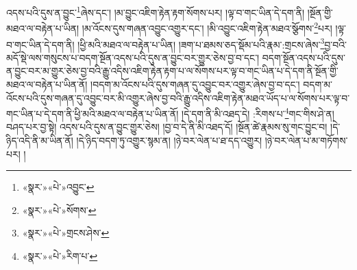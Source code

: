 འདས་པའི་དུས་ན་བྱུང་\footnote{«སྣར་»«པེ་»འབྱུང་}ཞེས་དང་། །མ་བྱུང་འཇིག་རྟེན་རྟག་སོགས་པར། །ལྟ་བ་གང་ཡིན་དེ་དག་ནི། །སྔོན་གྱི་མཐའ་ལ་བརྟེན་པ་ཡིན། །མ་འོངས་དུས་གཞན་འབྱུང་འགྱུར་དང་། །མི་འབྱུང་འཇིག་རྟེན་མཐའ་སྩོགས་\footnote{«སྣར་»«པེ་»སོགས་}པར། །ལྟ་བ་གང་ཡིན་དེ་དག་ནི། །ཕྱི་མའི་མཐའ་ལ་བརྟེན་པ་ཡིན། །ཟག་པ་ཐམས་ཅད་སྡོམ་པའི་རྣམ་:གྲངས་ཞེས་\footnote{«སྣར་»«པེ་»གྲངས་ཤེས་}བྱ་བའི་མདོ་སྡེ་ལས་གསུངས་པ་བདག་སྔོན་འདས་པའི་དུས་ན་བྱུང་བར་གྱུར་ཅེས་བྱ་བ་དང་། བདག་སྔོན་འདས་པའི་དུས་ན་བྱུང་བར་མ་གྱུར་ཅེས་བྱ་བའི་རྒྱུ་འདིས་འཇིག་རྟེན་རྟག་པ་ལ་སོགས་པར་ལྟ་བ་གང་ཡིན་པ་དེ་དག་ནི་སྔོན་གྱི་མཐའ་ལ་བརྟེན་པ་ཡིན་ནོ། །བདག་མ་འོངས་པའི་དུས་གཞན་དུ་འབྱུང་བར་འགྱུར་ཞེས་བྱ་བ་དང་། བདག་མ་འོངས་པའི་དུས་གཞན་དུ་འབྱུང་བར་མི་འགྱུར་ཞེས་བྱ་བའི་རྒྱུ་འདིས་འཇིག་རྟེན་མཐའ་ཡོད་པ་ལ་སོགས་པར་ལྟ་བ་གང་ཡིན་པ་དེ་དག་ནི་ཕྱི་མའི་མཐའ་ལ་བརྟེན་པ་ཡིན་ནོ། །དེ་དག་ནི་མི་འཐད་དེ། :རིགས་པ་\footnote{«སྣར་»«པེ་»རིག་པ་}གང་གིས་ཤེ་ན། བཤད་པར་བྱ་སྟེ། འདས་པའི་དུས་ན་བྱུང་གྱུར་ཅེས། །བྱ་བ་དེ་ནི་མི་འཐད་དོ། །སྔོན་ཚེ་རྣམས་སུ་གང་བྱུང་བ། །དེ་ཉིད་འདི་ནི་མ་ཡིན་ནོ། །དེ་ཉིད་བདག་ཏུ་འགྱུར་སྙམ་ན། །ཉེ་བར་ལེན་པ་ཐ་དད་འགྱུར། །ཉེ་བར་ལེན་པ་མ་གཏོགས་པར། །
